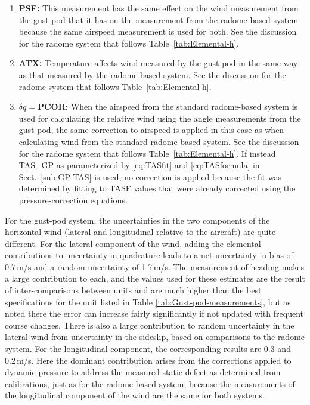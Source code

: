 \documentclass[12pt,twoside,english]{article}\usepackage[]{graphicx}\usepackage[]{color}
\let\OrgIndex\index
\renewcommand*{\index}[1]{\OrgIndex{#1}}
\begin{document}
\begin{enumerate}
\item \textbf{PSF:} 
This measurement has the same effect on the wind measurement from the gust pod that it has on the measurement from the radome-based system because the same airspeed measurement is used for both. See the discussion for the radome system that follows Table~\ref{tab:Elemental-h}.  
\item \textbf{ATX:}
Temperature affects wind measured by the gust pod in the same way as that measured by the radome-based system. See the discussion for the radome system that follows Table~\ref{tab:Elemental-h}.  
\item \textbf{$\delta q=$PCOR:} 
When the airspeed from
the standard radome-based system is used for calculating the relative
wind using the angle measurements from the gust-pod, the same correction
to airspeed is applied in this case as when calculating wind
from the standard radome-based system. See the discussion for the
radome system that follows Table~\ref{tab:Elemental-h}. If instead
TAS\_GP as parameterized by \eqref{eq:TASfit} and \eqref{eq:TASformula} in Sect.~\ref{sub:GP-TAS} is used, no correction is applied because the
fit was determined by fitting to TASF values that were already corrected
using the pressure-correction equations.
\end{enumerate}

For the gust-pod system, the uncertainties in the two components of the horizontal wind (lateral  and longitudinal relative to the aircraft) are quite different. For the lateral component of the wind, adding the elemental contributions to uncertainty in quadrature leads to a net uncertainty in bias of 0.7\,m/s and a random uncertainty of 1.7\,m/s. The measurement of heading makes a large contribution to each, and the values used for these estimates are the result of inter-comparisons between units and are much higher than the best specifications for the unit listed in Table \ref{tab:Gust-pod-measurements}, but as noted there the error can increase fairly significantly if not updated with frequent course changes. There is also a large contribution to random uncertainty in the lateral wind from uncertainty in the sideslip, based on comparisons to the radome system. For the longitudinal component, the corresponding results are 0.3 and 0.2\,m/s. Here the dominant contribution arises from the corrections applied to dynamic pressure to address the measured static defect as determined from calibrations, just as for the radome-based system, because the measurements of the longitudinal component of the wind are the same for both systems. 
\end{document}
